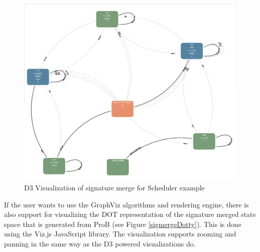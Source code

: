 \begin{center}
\begin{figure}[h!]
\centering
\includegraphics[width=14cm]{bilder/sigmerge.png}
\caption{D3 Visualization of signature merge for Scheduler example}
\label{sigmerge}
\end{figure}
\end{center}

If the user wants to use the GraphViz algorithms and rendering engine, there is also support for visualizing the DOT representation of the signature merged state space that is generated from ProB (see Figure \ref{sigmergeDotty}). This is done using the Viz.js JavaScript library. The visualization supports zooming and panning in the same way as the D3 powered visualizations do.

